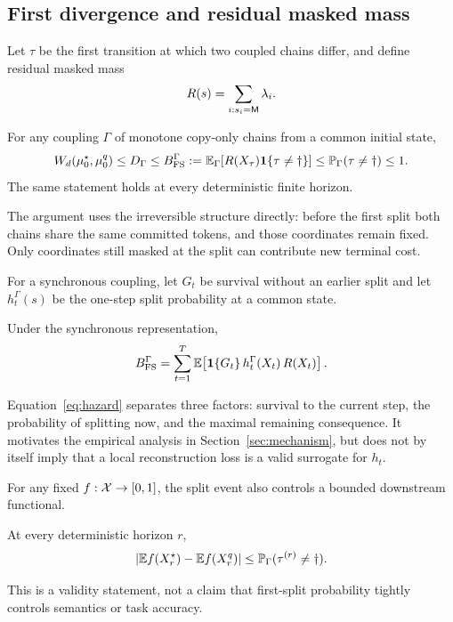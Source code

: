 \subsection{First divergence and residual masked mass}
Let $\tau$ be the first transition at which two coupled chains differ, and define residual masked mass
\[
R(s)=\sum_{i:s_i=\mathsf{M}}\lambda_i.
\]
\begin{theorem}
\label{thm:fs}
For any coupling $\Gamma$ of monotone copy-only chains from a common initial state,
\begin{equation}
W_{d}(\mu_0^\star,\mu_0^q)
\le D_\Gamma
\le B_{\mathrm{FS}}^\Gamma
:=\mathbb{E}_\Gamma[R(X_\tau)\mathbf{1}\{\tau\ne\dagger\}]
\le \mathbb{P}_\Gamma(\tau\ne\dagger)
\le1.
\label{eq:fs-main}
\end{equation}
The same statement holds at every deterministic finite horizon.
\end{theorem}
\proofapp
The argument uses the irreversible structure directly: before the first split both chains share the same committed tokens, and those coordinates remain fixed. Only coordinates still masked at the split can contribute new terminal cost.

For a synchronous coupling, let $G_t$ be survival without an earlier split and let $h_t^\Gamma(s)$ be the one-step split probability at a common state.
\begin{proposition}
\label{prop:hazard}
Under the synchronous representation,
\begin{equation}
B_{\mathrm{FS}}^\Gamma
=\sum_{t=1}^T
\mathbb{E}\!\left[
\mathbf{1}\{G_t\}\,h_t^\Gamma(X_t)\,R(X_t)
\right].
\label{eq:hazard}
\end{equation}
\end{proposition}
\proofapp
Equation~\eqref{eq:hazard} separates three factors: survival to the current step, the probability of splitting now, and the maximal remaining consequence. It motivates the empirical analysis in Section~\ref{sec:mechanism}, but does not by itself imply that a local reconstruction loss is a valid surrogate for $h_t$.

For any fixed $f:\mathcal{X}\to[0,1]$, the split event also controls a bounded downstream functional.
\begin{corollary}
\label{cor:functional}
At every deterministic horizon $r$,
\[
|\mathbb{E} f(X_r^\star)-\mathbb{E} f(X_r^q)|
\le \mathbb{P}_\Gamma(\tau^{(r)}\ne\dagger).
\]
\end{corollary}
\proofapp
This is a validity statement, not a claim that first-split probability tightly controls semantics or task accuracy.

